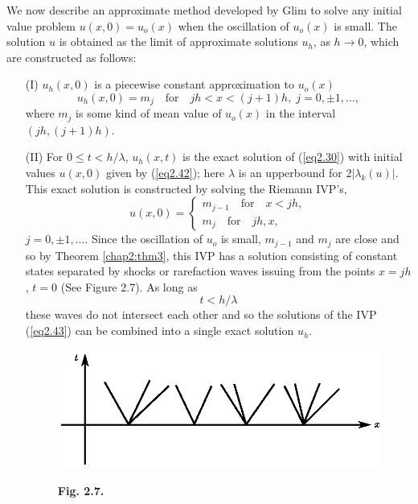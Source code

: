 We now describe an approximate method developed by Glim to solve any initial value problem $u(x,0) = u_o (x)$ when the oscillation of $u_o(x)$ is small. The solution $u$ is obtained as the limit of approximate solutions $u_h$, as $h\to 0$, which are constructed as follows:
\begin{itemize}
\item[{\rm (I)}] $u_h (x,0)$ is a piecewise constant approximation to $u_o(x)$
\begin{equation*}
u_h (x,0) = m_j \quad \text{for} \quad jh < x < (j+1)h, \; j = 0, \pm 1, \ldots, \tag{2.42}\label{eq2.42}
\end{equation*}
where $m_j$ is some kind of mean value of $u_o(x)$ in the interval $(jh, (j+1)h)$.

\item[{\rm (II)}] For $0\leq t < h/\lambda$, $u_h(x,t)$ is the exact solution of (\ref{eq2.30}) with initial values $u(x,0)$ given by (\ref{eq2.42}); here $\lambda$ is an upper\pageoriginale bound for $2|\lambda_k(u)|$. This exact solution is constructed by solving the Riemann IVP's,
\begin{equation*}
u(x,0) = 
\begin{cases}
m_{j-1} \quad \text{for} \quad x < jh,\\
m_j \quad \text{for} \quad jh , x,
\end{cases}
\tag{2.43}\label{eq2.43}
\end{equation*}
$j = 0, \pm 1, \ldots$. Since the oscillation of $u_o$ is small, $m_{j-1}$ and $m_j$ are close and so by Theorem \ref{chap2:thm3}, this IVP has a solution consisting of constant states separated by shocks or rarefaction waves issuing from the points $x= jh$, $t=0$ (See Figure 2.7). As long as 
\begin{equation*}
t <  h /\lambda\tag{2.44}\label{eq2.44}
\end{equation*}
these waves do not intersect each other and so the solutions of the IVP (\ref{eq2.43}) can be combined into a single exact solution $u_h$.
\begin{figure}[H]
\centering
\includegraphics{figures/fig2.7.eps}
\centerline{\bf Fig. 2.7.}
\end{figure}


\end{itemize}

